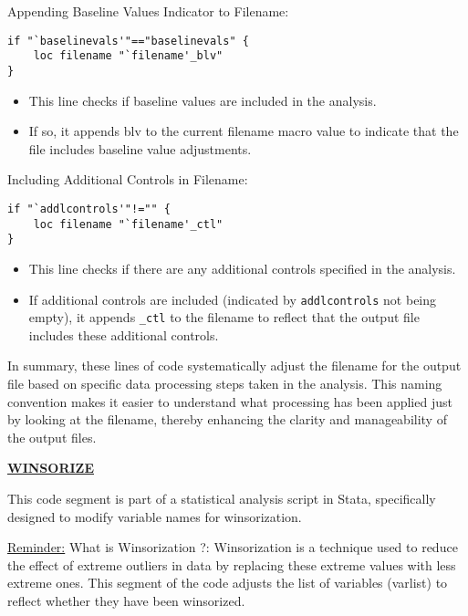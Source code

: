 \documentclass{article}
\begin{document}
Appending Baseline Values Indicator to Filename:
\begin{mdframed}
\begin{verbatim}
if "`baselinevals'"=="baselinevals" {
	loc filename "`filename'_blv"
}
\end{verbatim}
\end{mdframed}

\begin{itemize}
    \item This line checks if baseline values are included in the analysis.
    \item If so, it appends blv to the current filename macro value to indicate that the file includes baseline value adjustments.
\end{itemize}


Including Additional Controls in Filename:
\begin{mdframed}
\begin{verbatim}
if "`addlcontrols'"!="" {
	loc filename "`filename'_ctl"
}
\end{verbatim}
\end{mdframed}

\begin{itemize}
    \item This line checks if there are any additional controls specified in the analysis.
    \item If additional controls are included (indicated by \texttt{addlcontrols} not being empty), it appends \texttt{\_ctl} to the filename to reflect that the output file includes these additional controls.
\end{itemize}

In summary, these lines of code systematically adjust the filename for the output file based on specific data processing steps taken in the analysis. This naming convention makes it easier to understand what processing has been applied just by looking at the filename, thereby enhancing the clarity and manageability of the output files.



\vspace{0.5cm}\underline{\textbf{WINSORIZE}}

\vspace{0.2cm}This code segment is part of a statistical analysis script in Stata, specifically designed to modify variable names for winsorization. 

\underline{Reminder:}
What is Winsorization ?:  Winsorization is a technique used to reduce the effect of extreme outliers in data by replacing these extreme values with less extreme ones. 
This segment of the code adjusts the list of variables (varlist) to reflect whether they have been winsorized.\newline 
\end{document}
